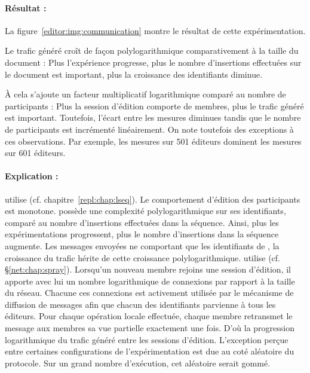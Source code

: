 \paragraph{Résultat :} La figure~\ref{editor:img:communication} montre le
résultat de cette expérimentation.
\begin{inparaenum}[(i)]
\item Le trafic généré croît de façon polylogarithmique comparativement à la
  taille du document : Plus l'expérience progresse, plus le nombre d'insertions
  effectuées sur le document est important, plus la croissance des identifiants
  diminue.
\item À cela s'ajoute un facteur multiplicatif logarithmique comparé au nombre
  de participants : Plus la session d'édition comporte de membres, plus le trafic
  généré est important. Toutefois, l'écart entre les mesures diminues tandis que
  le nombre de participants est incrémenté linéairement. On note toutefois des
  exceptions à ces observations. Par exemple, les mesures sur 501 éditeurs
  dominent les mesures sur 601 éditeurs.
\end{inparaenum}

\paragraph{Explication :} \CRATE utilise \LSEQ
(cf. chapitre~\ref{repl:chap:lseq}). Le comportement d'édition des participants
est monotone. \LSEQ possède une complexité polylogarithmique sur ses
identifiants, comparé au nombre d'insertions effectuées dans la séquence. Ainsi,
plus les expérimentations progressent, plus le nombre d'insertions dans la
séquence augmente. Les messages envoyées ne comportant que les identifiants de
\LSEQ, la croissance du trafic hérite de cette croissance
polylogarithmique. \CRATE utilise \SPRAY
(cf. §\ref{net:chap:spray}). Lorsqu'un nouveau membre rejoins une
session d'édition, il apporte avec lui un nombre logarithmique de connexions par
rapport à la taille du réseau. Chacune ces connexions est activement utilisée
par le mécanisme de diffusion de messages afin que chacun des identifiants
parvienne à tous les éditeurs. Pour chaque opération locale effectuée, chaque
membre retransmet le message aux membres sa vue partielle exactement une
fois. D'où la progression logarithmique du trafic généré entre les sessions
d'édition. L'exception perçue entre certaines configurations de
l'expérimentation est due au coté aléatoire du protocole. Sur un grand nombre
d'exécution, cet aléatoire serait gommé.



